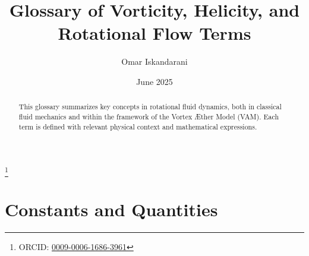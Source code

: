 \documentclass[a4paper, aps,preprint,superscriptaddress, 12pt]{revtex4}
\begin{document}
    \title{Glossary of Vorticity, Helicity, and Rotational Flow Terms}
    \author{Omar Iskandarani}
    \date{June 2025}
    \thanks{ORCID: \href{https://orcid.org/0009-0006-1686-3961}{0009-0006-1686-3961}}

    \begin{abstract}
        This glossary summarizes key concepts in rotational fluid dynamics, both in classical fluid mechanics and within the framework of the Vortex Æther Model (VAM). Each term is defined with relevant physical context and mathematical expressions.
    \end{abstract}

    \maketitle

    \section*{Constants and Quantities}
    \small%
\end{document}

